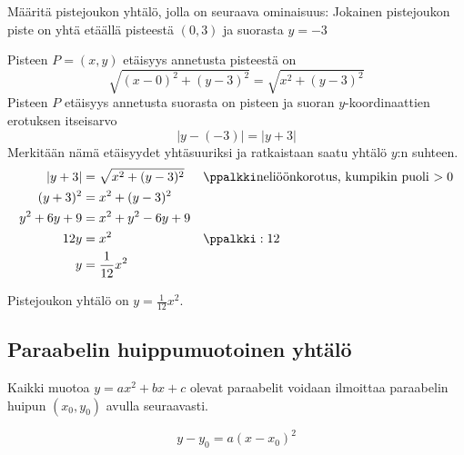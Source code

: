 \begin{esimerkki}
Määritä pistejoukon yhtälö, jolla on seuraava ominaisuus: Jokainen pistejoukon piste on yhtä etäällä pisteestä $(0, 3)$ ja suorasta $y=-3$
\begin{esimratk}
Pisteen $P=(x, y)$ etäisyys annetusta pisteestä on
\[
\sqrt{(x-0)^2+(y-3)^2}=\sqrt{x^2+(y-3)^2}
\]
Pisteen $P$ etäisyys annetusta suorasta on pisteen ja suoran $y$-koordinaattien erotuksen itseisarvo
\[
|y-(-3)| = |y+3| 
\]
Merkitään nämä etäisyydet yhtäsuuriksi ja ratkaistaan saatu yhtälö $y$:n suhteen.
\begin{align*}
|y+3| & = \sqrt{x^2+(y-3)^2} &&\ppalkki \text{neliöönkorotus, kumpikin puoli $>0$}\\
(y+3)^2  &= x^2+(y-3)^2 \\
y^2+6y+9 &=  x^2+y^2-6y+9\\
12y &= x^2 &&\ppalkki : 12\\
y &= \frac{1}{12}x^2
\end{align*}

Pistejoukon yhtälö on $y=\frac{1}{12}x^2$.

\end{esimratk}
\end{esimerkki}

\subsection{Paraabelin huippumuotoinen yhtälö}

Kaikki muotoa $y=ax^2+bx+c$ olevat paraabelit voidaan ilmoittaa paraabelin huipun $(x_0, y_0)$ avulla seuraavasti.

\[
y-y_0 = a(x-x_0)^2
\]


